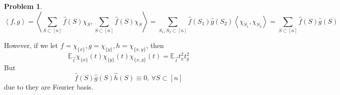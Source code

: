 \documentclass[a4paper]{article}
\theoremstyle{definition}
\newtheorem{problem}{Problem}
\theoremstyle{plain}
\newcommand{\Ebb}{\mathbb E}
\newcommand{\<}{\left<}
\renewcommand{\>}{\right>}
\numberwithin{equation}{problem}
\begin{document}
\begin{problem}
    \[\<f,g\>=\<\sum_{S\subset [n]}\hat{f}(S)\chi_S,\sum_{S\subset [n]}\hat{f}(S)\chi_S\>=\sum_{S_1,S_2\subset [n]}\hat{f}(S_1)\hat{g}(S_2)\<\chi_{S_1},\chi_{S_2}\>=\sum_{S\subset [n]}\hat{f}(S)\hat{g}(S)\]

    However, if we let  $ f=\chi_{\{x\}},g=\chi_{\{y\}},h=\chi_{\{x,y\}} $, then 
    \[\Ebb_{\vec{t}}\chi_{\{x\}}(t)\chi_{\{y\}}(t)\chi_{\{x,y\}}(t)=\Ebb_{\vec{t}}t_x^2t_y^2\]
    But 
    \[\hat{f}(S)\hat{g}(S)\hat{h}(S)\equiv 0,\,\forall S\subset [n]\]
    due to they are Fourier basis.
\end{problem}
\end{document}
